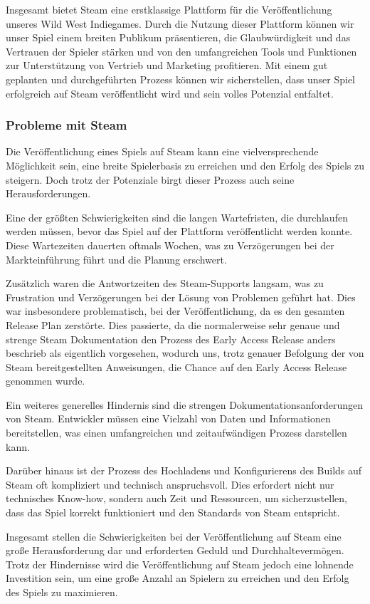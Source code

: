 Insgesamt bietet Steam eine erstklassige Plattform für die Veröffentlichung unseres Wild West Indiegames.
Durch die Nutzung dieser Plattform können wir unser Spiel einem breiten Publikum präsentieren, die Glaubwürdigkeit und das Vertrauen der Spieler stärken und von den umfangreichen Tools und Funktionen zur Unterstützung von Vertrieb und Marketing profitieren.
Mit einem gut geplanten und durchgeführten Prozess können wir sicherstellen, dass unser Spiel erfolgreich auf Steam veröffentlicht wird und sein volles Potenzial entfaltet.

 \subsubsection{Probleme mit Steam}\label{subsubsec:Steam-Herausforderungen}
Die Veröffentlichung eines Spiels auf Steam kann eine vielversprechende Möglichkeit sein, eine breite Spielerbasis zu erreichen und den Erfolg des Spiels zu steigern.
Doch trotz der Potenziale birgt dieser Prozess auch seine Herausforderungen.

Eine der größten Schwierigkeiten sind die langen Wartefristen, die durchlaufen werden müssen, bevor das Spiel auf der Plattform veröffentlicht werden konnte.
Diese Wartezeiten dauerten oftmals Wochen, was zu Verzögerungen bei der Markteinführung führt und die Planung erschwert.

Zusätzlich waren die Antwortzeiten des Steam-Supports langsam, was zu Frustration und Verzögerungen bei der Lösung von Problemen geführt hat.
Dies war insbesondere problematisch, bei der Veröffentlichung, da es den gesamten Release Plan zerstörte.
Dies passierte, da die normalerweise sehr genaue und strenge Steam Dokumentation den Prozess des Early Access Release anders beschrieb als eigentlich vorgesehen, wodurch uns, trotz genauer Befolgung der von Steam bereitgestellten Anweisungen, die Chance auf den Early Access Release genommen wurde.

Ein weiteres generelles Hindernis sind die strengen Dokumentationsanforderungen von Steam.
Entwickler müssen eine Vielzahl von Daten und Informationen bereitstellen, was einen umfangreichen und zeitaufwändigen Prozess darstellen kann.

Darüber hinaus ist der Prozess des Hochladens und Konfigurierens des Builds auf Steam oft kompliziert und technisch anspruchsvoll.
Dies erfordert nicht nur technisches Know-how, sondern auch Zeit und Ressourcen, um sicherzustellen, dass das Spiel korrekt funktioniert und den Standards von Steam entspricht.

Insgesamt stellen die Schwierigkeiten bei der Veröffentlichung auf Steam eine große Herausforderung dar und erforderten Geduld und Durchhaltevermögen.
Trotz der Hindernisse wird die Veröffentlichung auf Steam jedoch eine lohnende Investition sein, um eine große Anzahl an Spielern zu erreichen und den Erfolg des Spiels zu maximieren.



%

\renewcommand{\kapitelautor}{}